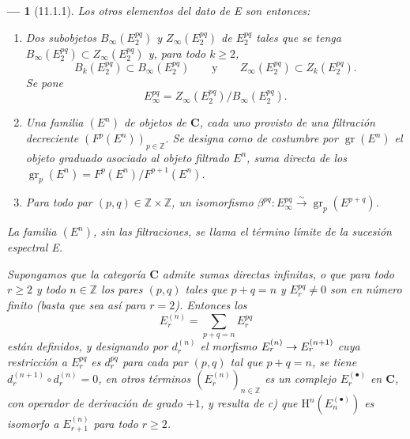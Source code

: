 \documentclass[10pt,oneside,openany]{book}
\theoremstyle{egaenv}\newtheorem*{env}{---}
\theoremstyle{egastatement}
\theoremstyle{egadescription}
\newcommand{\oldpage}[2][]{\marginnote{\normalfont\scriptsize\textbf{#1}\,|\,#2}\ignorespaces}
\renewcommand{\geq}{\geqslant}
\renewcommand{\to}{\mathchoice{\longrightarrow}{\rightarrow}{\rightarrow}{\rightarrow}}
\begin{document}
\begin{env}[11.1.1]
Los otros elementos del dato de E son entonces:
\begin{enumerate}
  \item[$d)$] Dos subobjetos $B_\infty(E_2^{pq})$ y
    $Z_\infty(E_2^{pq})$ de $E_2^{pq}$ tales que se tenga
    $B_\infty(E_2^{pq})\subset Z_\infty(E_2^{pq})$ y, para todo $k\geq2$,
    \[
      B_k(E_2^{pq})\subset B_\infty(E_2^{pq})
      \qquad\text{y}\qquad
      Z_\infty(E_2^{pq})\subset Z_k(E_2^{pq}).
    \]
    Se pone
    \[
    \label{0.11.1.1.3-fr}
      E_\infty^{pq}=Z_\infty(E_2^{pq})/B_\infty(E_2^{pq}).
      \tag{11.1.1.3}
    \]
  \item[$e)$]
    \oldpage[0\textsubscript{III}]{24}
    Una familia $(E^n)$ de objetos de $\boldsymbol{C}$, cada uno provisto de una
    \emph{filtración decreciente} $(F^p(E^n))_{p\in\mathbb Z}$. Se designa
    como de costumbre por $\operatorname{gr}(E^n)$ el objeto graduado asociado al
    objeto filtrado $E^n$, suma directa de los
    $\operatorname{gr}_p(E^n)=F^p(E^n)/F^{p+1}(E^n)$.
  \item[$f)$] Para todo par $(p,q)\in\mathbb Z\times\mathbb Z$, un
    isomorfismo
    $\beta^{pq}:E_\infty^{pq}\xrightarrow{\sim}
    \operatorname{gr}_p(E^{p+q})$.
\end{enumerate}

La familia $(E^n)$, sin las filtraciones, se llama el \emph{término límite}
de la sucesión espectral E.

Supongamos que la categoría $\boldsymbol{C}$ admite sumas directas infinitas,
o que para todo $r\geq2$ y todo $n\in\mathbb Z$ los pares $(p,q)$ tales
que $p+q=n$ y $E_r^{pq}\ne0$ son en número finito (basta que sea así
para $r=2$). Entonces los
\[
  E_r^{(n)}=\sum_{p+q=n}E_r^{pq}
\]
están definidos, y designando por $d_r^{(n)}$ el morfismo
$E_r^{(n)}\to E_r^{(n+1)}$ cuya restricción a $E_r^{pq}$ es $d_r^{pq}$
para cada par $(p,q)$ tal que $p+q=n$, se tiene
$d_r^{(n+1)}\circ d_r^{(n)}=0$, en otros términos $(E_r^{(n)})_{n\in\mathbb Z}$
es un \emph{complejo $E_r^{(\bullet)}$} en $\boldsymbol{C}$, con operador de
derivación de grado $+1$, y resulta de \emph{c)} que
$\mathrm H^n(E_n^{(\bullet)})$ es \emph{isomorfo a} $E_{r+1}^{(n)}$ para todo
$r\geq2$.
\end{env}
\end{document}
